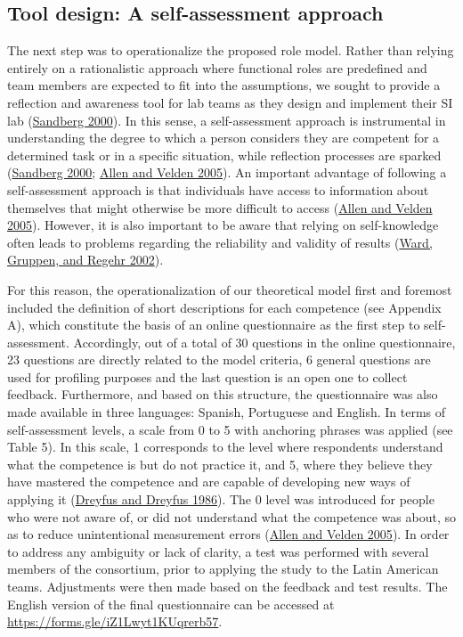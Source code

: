 \documentclass[AMA,STIX1COL,APA,STIX2COL]{WileyNJD-v2}
\begin{document}
\hypertarget{tool-design-a-self-assessment-approach}{%
\subsection{Tool design: A self-assessment
approach}\label{tool-design-a-self-assessment-approach}}

The next step was to operationalize the proposed role model. Rather than
relying entirely on a rationalistic approach where functional roles are
predefined and team members are expected to fit into the assumptions, we
sought to provide a reflection and awareness tool for lab teams as they
design and implement their SI lab
(\protect\hyperlink{ref-Sandberg2000}{Sandberg 2000}). In this sense, a
self-assessment approach is instrumental in understanding the degree to
which a person considers they are competent for a determined task or in
a specific situation, while reflection processes are sparked
(\protect\hyperlink{ref-Sandberg2000}{Sandberg 2000};
\protect\hyperlink{ref-Allen2005}{Allen and Velden 2005}). An important
advantage of following a self-assessment approach is that individuals
have access to information about themselves that might otherwise be more
difficult to access (\protect\hyperlink{ref-Allen2005}{Allen and Velden
2005}). However, it is also important to be aware that relying on
self-knowledge often leads to problems regarding the reliability and
validity of results (\protect\hyperlink{ref-Ward2002}{Ward, Gruppen, and
Regehr 2002}).

For this reason, the operationalization of our theoretical model first
and foremost included the definition of short descriptions for each
competence (see Appendix A), which constitute the basis of an online
questionnaire as the first step to self-assessment. Accordingly, out of
a total of 30 questions in the online questionnaire, 23 questions are
directly related to the model criteria, 6 general questions are used for
profiling purposes and the last question is an open one to collect
feedback. Furthermore, and based on this structure, the questionnaire
was also made available in three languages: Spanish, Portuguese and
English. In terms of self-assessment levels, a scale from 0 to 5 with
anchoring phrases was applied (see Table 5). In this scale, 1
corresponds to the level where respondents understand what the
competence is but do not practice it, and 5, where they believe they
have mastered the competence and are capable of developing new ways of
applying it (\protect\hyperlink{ref-Dreyfus1986}{Dreyfus and Dreyfus
1986}). The 0 level was introduced for people who were not aware of, or
did not understand what the competence was about, so as to reduce
unintentional measurement errors
(\protect\hyperlink{ref-Allen2005}{Allen and Velden 2005}). In order to
address any ambiguity or lack of clarity, a test was performed with
several members of the consortium, prior to applying the study to the
Latin American teams. Adjustments were then made based on the feedback
and test results. The English version of the final questionnaire can be
accessed at \url{https://forms.gle/iZ1Lwyt1KUqrerb57}.
\end{document}
